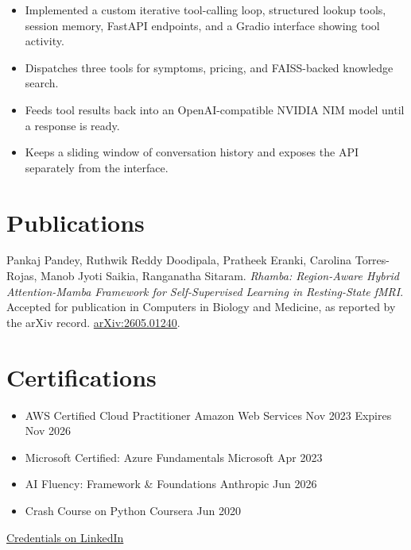 \documentclass[11pt,letterpaper]{article}
\begin{document}
\begin{itemize}
\item Implemented a custom iterative tool-calling loop, structured lookup tools, session memory, FastAPI endpoints, and a Gradio interface showing tool activity.
\item Dispatches three tools for symptoms, pricing, and FAISS-backed knowledge search.
\item Feeds tool results back into an OpenAI-compatible NVIDIA NIM model until a response is ready.
\item Keeps a sliding window of conversation history and exposes the API separately from the interface.
\end{itemize}\vspace{3pt}
\section*{Publications}
Pankaj Pandey, Ruthwik Reddy Doodipala, Pratheek Eranki, Carolina Torres-Rojas, Manob Jyoti Saikia, Ranganatha Sitaram. \textit{Rhamba: Region-Aware Hybrid Attention-Mamba Framework for Self-Supervised Learning in Resting-State fMRI}. Accepted for publication in Computers in Biology and Medicine, as reported by the arXiv record. \href{https://arxiv.org/abs/2605.01240}{arXiv:2605.01240}.
\section*{Certifications}
\begin{itemize}
\item AWS Certified Cloud Practitioner \textemdash{} Amazon Web Services \hfill {\small{}Nov 2023 \textperiodcentered{} Expires Nov 2026}
\item Microsoft Certified: Azure Fundamentals \textemdash{} Microsoft \hfill {\small{}Apr 2023}
\item AI Fluency: Framework \& Foundations \textemdash{} Anthropic \hfill {\small{}Jun 2026}
\item Crash Course on Python \textemdash{} Coursera \hfill {\small{}Jun 2020}
\end{itemize}
{\small{} \href{https://www.linkedin.com/in/pratheekeranki64/details/certifications/}{Credentials on LinkedIn}}
\end{document}
